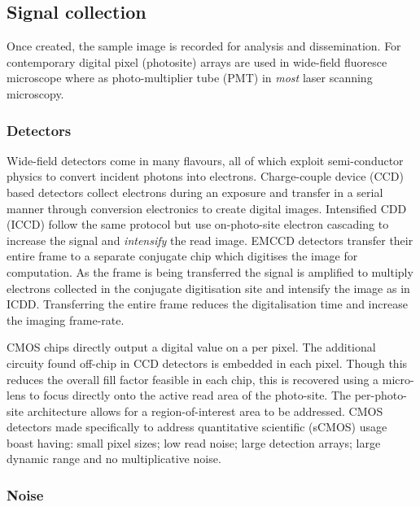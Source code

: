 \subsection{Signal collection}

Once created, the sample image is recorded for analysis and dissemination.
For contemporary digital pixel (photosite) arrays are used in wide-field fluoresce microscope where as photo-multiplier tube (PMT) in \emph{most} laser scanning microscopy.

\subsubsection{Detectors}

Wide-field detectors come in many flavours, all of which exploit semi-conductor physics to convert incident photons into electrons.
Charge-couple device (CCD) based detectors collect electrons during an exposure and transfer in a serial manner through conversion electronics to create digital images.
Intensified CDD (ICCD) follow the same protocol but use on-photo-site electron cascading to increase the signal and \emph{intensify} the read image.
EMCCD detectors transfer their entire frame to a separate conjugate chip which digitises the image for computation.
As the frame is being transferred the signal is amplified to multiply electrons collected in the conjugate digitisation site and intensify the image as in ICDD.
Transferring the entire frame reduces the digitalisation time and increase the imaging frame-rate.

CMOS chips directly output a digital value on a per pixel.
The additional circuity found off-chip in CCD detectors is embedded in each pixel.
Though this reduces the overall fill factor feasible in each chip, this is recovered using a micro-lens to focus directly onto the active read area of the photo-site.
The per-photo-site architecture allows for a region-of-interest area to be addressed.
CMOS detectors made specifically to address quantitative scientific (sCMOS) usage boast having: small pixel sizes; low read noise; large detection arrays; large dynamic range and no multiplicative noise.




\subsubsection{Noise}

